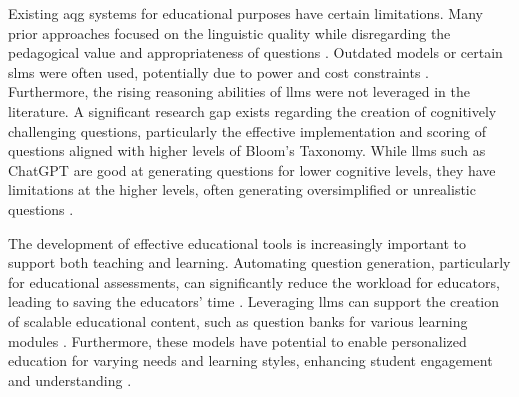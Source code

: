  Existing \ac{aqg} systems for educational purposes have certain limitations. Many prior approaches focused on the linguistic quality while disregarding the pedagogical value and appropriateness of questions \cite{horbach_linguistic_2020,steuer_i_2021}. Outdated models \cite{cheng_treequestion_2024,elkins_how_2023,bhowmick_automating_2023} or certain \ac{slms} \cite{luo_systematic_2023} were often used, potentially due to power and cost constraints \cite{zhuge_twinstar_2025,vu_chatgpt-based_2024}. Furthermore, the rising reasoning abilities of \ac{llms} were not leveraged in the literature. 
A significant research gap exists regarding the creation of cognitively challenging questions, particularly the effective implementation and scoring of questions aligned with higher levels of Bloom's Taxonomy. While \ac{llms} such as ChatGPT \cite{openai_introducing_2022} are good at generating questions for lower cognitive levels, they have limitations at the higher levels, often generating oversimplified or unrealistic questions \cite{duong-trung_bloomllm_2024,elkins_how_2023,scaria_automated_2024}. 


 The development of effective educational tools is increasingly important to support both teaching and learning. Automating question generation, particularly for educational assessments, can significantly reduce the workload for educators, leading to saving the educators' time \cite{biancini_multiple-choice_2024,hang_mcqgen_2024,vu_chatgpt-based_2024,cheng_treequestion_2024}. 
Leveraging \ac{llms} can support the creation of scalable educational content, such as question banks for various learning modules \cite{vu_chatgpt-based_2024}. Furthermore, these models have potential to enable personalized education for varying needs and learning styles, enhancing student engagement and understanding \cite{hang_mcqgen_2024}.

